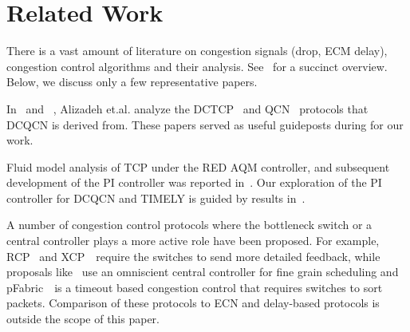\vspace{-0.5em}
\section{Related Work}
\label{sec:related}

There is a vast amount of literature on congestion signals (drop, ECM delay),
congestion control algorithms and their analysis. See~\cite{srikantbook} for a
succinct overview. Below, we discuss only a few representative papers.

In~\cite{dctcp-analysis} and ~\cite{qcn-analysis}, Alizadeh et.al. analyze the
DCTCP~\cite{dctcp} and QCN~\cite{qcn} protocols that DCQCN is derived from.
These papers served as useful guideposts during for our work.

Fluid model analysis of TCP under the RED AQM controller, and subsequent
development of the PI controller was reported
in~\cite{misra2000fluid,hollot2001designing}. Our exploration of the PI
controller for DCQCN and TIMELY is guided by results
in~\cite{hollot2001designing}.

A number of congestion control protocols where the bottleneck switch or a
central controller plays a more active role have been proposed.  For example,
RCP~\cite{dukkipati2006rcp} and XCP~\cite{katabi2002congestion}~require the
switches to send more detailed feedback, while proposals
like~\cite{vattikonda2012practical,deadline,perry2014fastpass} use an omniscient
central controller for fine grain scheduling and pFabric~\cite{pfabric}~is a
timeout based congestion control that requires switches to sort packets.
Comparison of these protocols to ECN and delay-based protocols is outside the
scope of this paper.



